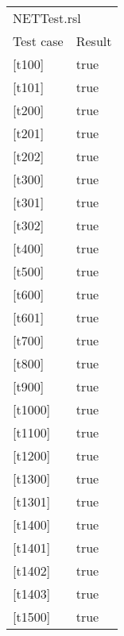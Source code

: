 \documentclass[a4]{article}
\begin{document}
\begin{table}[]
    \begin{tabular}{ll}
        \multicolumn{2}{l}{NETTest.rsl}          \\
        \multicolumn{1}{l|}{Test case}  & Result \\
        \multicolumn{1}{l|}{{[}t100{]}} & true   \\
        \multicolumn{1}{l|}{{[}t101{]}} & true   \\
        \multicolumn{1}{l|}{{[}t200{]}} & true   \\
        \multicolumn{1}{l|}{{[}t201{]}} & true   \\
        \multicolumn{1}{l|}{{[}t202{]}} & true   \\
        \multicolumn{1}{l|}{{[}t300{]}} & true   \\
        \multicolumn{1}{l|}{{[}t301{]}} & true   \\
        \multicolumn{1}{l|}{{[}t302{]}} & true   \\
        \multicolumn{1}{l|}{{[}t400{]}} & true   \\
        \multicolumn{1}{l|}{{[}t500{]}} & true   \\
        \multicolumn{1}{l|}{{[}t600{]}} & true   \\
        \multicolumn{1}{l|}{{[}t601{]}} & true   \\
        \multicolumn{1}{l|}{{[}t700{]}} & true   \\
        \multicolumn{1}{l|}{{[}t800{]}} & true   \\
        \multicolumn{1}{l|}{{[}t900{]}} & true   \\
        \multicolumn{1}{l|}{{[}t1000{]}} & true  \\
        \multicolumn{1}{l|}{{[}t1100{]}} & true  \\
        \multicolumn{1}{l|}{{[}t1200{]}} & true  \\
        \multicolumn{1}{l|}{{[}t1300{]}} & true  \\
        \multicolumn{1}{l|}{{[}t1301{]}} & true  \\
        \multicolumn{1}{l|}{{[}t1400{]}} & true  \\
        \multicolumn{1}{l|}{{[}t1401{]}} & true  \\
        \multicolumn{1}{l|}{{[}t1402{]}} & true  \\
        \multicolumn{1}{l|}{{[}t1403{]}} & true  \\
        \multicolumn{1}{l|}{{[}t1500{]}} & true  \\

\end{tabular}
\end{table}
\end{document}
